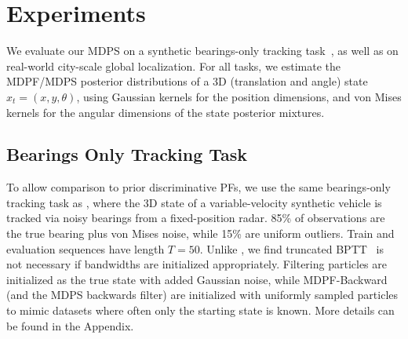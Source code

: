 

        
\section{Experiments} \label{sec:experiments}
\vspace*{-5pt}
    We evaluate our MDPS on a synthetic bearings-only tracking task~\cite{younis2023mdpf}, as well as on real-world city-scale global localization.  For all tasks, we estimate the MDPF/MDPS posterior distributions of a 3D (translation and angle) state $x_t = (x, y, \theta)$, using Gaussian kernels for the position dimensions, and von Mises kernels for the angular dimensions of the state posterior mixtures. 

    \vspace*{-10pt}
    \subsection{Bearings Only Tracking Task} \label{sec:bearings_only_task}
        To allow comparison to prior discriminative PFs, we use the same bearings-only tracking task as \citep{younis2023mdpf}, where the 3D state of a variable-velocity synthetic vehicle is tracked via noisy bearings from a fixed-position radar.  85\% of observations are the true bearing plus von Mises noise, while 15\% are uniform outliers.  
 Train and evaluation sequences have length $T=50$. Unlike \citet{younis2023mdpf}, we find truncated BPTT~\cite{Jaeger2005ATO} is not necessary if bandwidths are initialized appropriately. 
 Filtering particles are initialized as the true state with added Gaussian noise, while MDPF-Backward (and the MDPS backwards filter) are initialized with uniformly sampled particles to mimic datasets where often only the starting state is known.  More details can be found in the Appendix.

